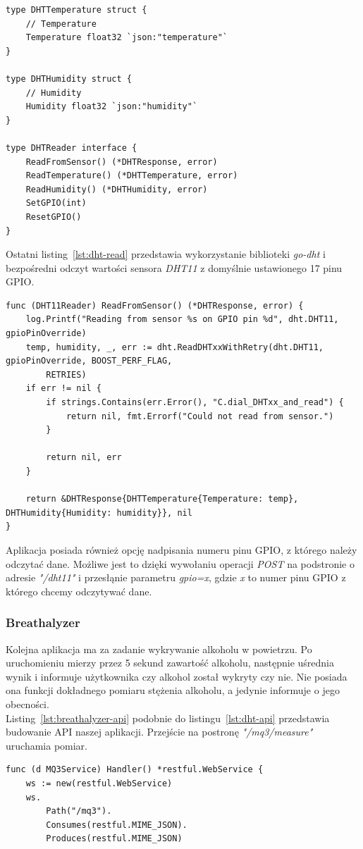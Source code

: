 \documentclass[12pt]{report}
\let\Oldsubsubsection\subsubsection
\renewcommand{\subsubsection}{\FloatBarrier\Oldsubsubsection}
\begin{document}
{\begin{lstlisting}[language=golang,caption=Struktury odpowiedzi serwera,label=lst:dht-struct]
type DHTTemperature struct {
	// Temperature
	Temperature float32 `json:"temperature"`
}

type DHTHumidity struct {
	// Humidity
	Humidity float32 `json:"humidity"`
}

type DHTReader interface {
	ReadFromSensor() (*DHTResponse, error)
	ReadTemperature() (*DHTTemperature, error)
	ReadHumidity() (*DHTHumidity, error)
	SetGPIO(int)
	ResetGPIO()
}
\end{lstlisting}

\noindent Ostatni listing~\ref{lst:dht-read} przedstawia wykorzystanie biblioteki \textit{go-dht} i bezpośredni odczyt wartości sensora \textit{DHT11} z domyślnie ustawionego 17 pinu GPIO.
\clearpage
\begin{lstlisting}[language=golang,caption=Odczyt danych z sensora DHT11,label=lst:dht-read]
func (DHT11Reader) ReadFromSensor() (*DHTResponse, error) {
	log.Printf("Reading from sensor %s on GPIO pin %d", dht.DHT11, gpioPinOverride)
	temp, humidity, _, err := dht.ReadDHTxxWithRetry(dht.DHT11, gpioPinOverride, BOOST_PERF_FLAG,
		RETRIES)
	if err != nil {
		if strings.Contains(err.Error(), "C.dial_DHTxx_and_read") {
			return nil, fmt.Errorf("Could not read from sensor.")
		}

		return nil, err
	}

	return &DHTResponse{DHTTemperature{Temperature: temp}, DHTHumidity{Humidity: humidity}}, nil
}
\end{lstlisting}

\noindent Aplikacja posiada również opcję nadpisania numeru pinu GPIO, z którego należy odczytać dane. Możliwe jest to dzięki wywołaniu operacji \textit{POST} na podstronie o adresie \textit{"/dht11"} i przesłąnie parametru \textit{gpio=x}, gdzie \textit{x} to numer pinu GPIO z którego chcemy odczytywać dane.

\subsubsection{Breathalyzer} \label{subsect:breathalyzer}
Kolejna aplikacja ma za zadanie wykrywanie alkoholu w powietrzu. Po uruchomieniu mierzy przez 5 sekund zawartość alkoholu, następnie uśrednia wynik i informuje użytkownika czy alkohol został wykryty czy nie. Nie posiada ona funkcji dokładnego pomiaru stężenia alkoholu, a jedynie informuje o jego obecności. \\

\noindent Listing~\ref{lst:breathalyzer-api} podobnie do listingu~\ref{lst:dht-api} przedstawia budowanie API naszej aplikacji. Przejście na postronę \textit{"/mq3/measure"} uruchamia pomiar.
\clearpage
\begin{lstlisting}[language=golang,caption=Konfiguracja API,label=lst:breathalyzer-api]
func (d MQ3Service) Handler() *restful.WebService {
	ws := new(restful.WebService)
	ws.
		Path("/mq3").
		Consumes(restful.MIME_JSON).
		Produces(restful.MIME_JSON)


\end{lstlisting}}
\end{document}
